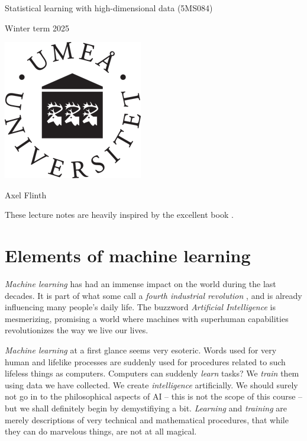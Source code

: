 \documentclass{article}
\author{Axel Flinth}
\date{January 2024}
\begin{document}
\begin{center}

    {\Large Statistical learning with high-dimensional data (5MS084)\\

    \vspace{1.5cm}
    
    Winter term 2025 \\

 \vspace{1.5cm}
    
    \includegraphics[width=.3\textwidth]{graphics/umu.png}

  \vspace{1.5cm}
    
    Axel Flinth}
   
\end{center}

\tableofcontents

These lecture notes are heavily inspired by the excellent book \cite{james2023introduction}.

\newpage


\section{Elements of machine learning}
\emph{Machine learning} has had an immense impact on the world during the last decades. It is part of what some call a \emph{fourth industrial revolution} \cite{SchwabIndustry}, and is already influencing many people's daily life. The buzzword \emph{Artificial Intelligence} is mesmerizing, promising a world where machines with superhuman capabilities revolutionizes the way we live our lives.

\emph{Machine learning} at a first glance seems very esoteric. Words used for very human and lifelike processes are suddenly used for procedures related to such lifeless things as computers. Computers can suddenly \emph{learn} tasks? We \emph{train} them using data we have collected. We create \emph{intelligence} artificially. We should surely not go in to the philosophical aspects of AI -- this is not the scope of this course -- but we shall definitely begin by demystifiying a bit. \emph{Learning} and \emph{training} are merely descriptions of very technical and mathematical procedures, that while they can do marvelous things, are not at all magical.
\end{document}
